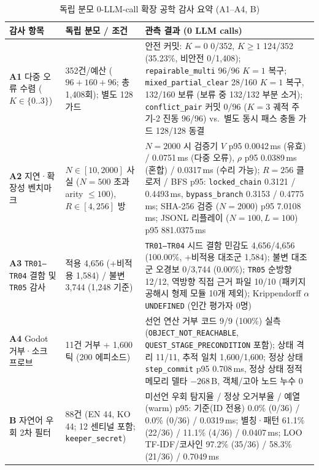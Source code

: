 \documentclass[journal]{IEEEtran}
\renewcommand{\arraystretch}{1.20}
\begin{document}
\begin{table}[!tbp]
\caption{독립 분모 0-LLM-call 확장 공학 감사 요약 (A1--A4, B)}
\label{tab:extended-audits}
\centering
\small
\renewcommand{\arraystretch}{1.20}
\begin{tabularx}{\textwidth}{@{}>{\raggedright\arraybackslash}p{} >{\raggedright\arraybackslash}p{} >{\raggedright\arraybackslash}X@{}}
\toprule
\textbf{감사 항목} & \textbf{독립 분모 / 조건} & \textbf{관측 결과 (0 LLM calls)} \\
\midrule
\textbf{A1} 다중 오류 수렴 ($K{\in}\{0..3\}$) & 352건/예산 ($96{+}160{+}96$; 총 1,408회); 별도 128 가드 & 안전 커밋: $K{=}0$ 0/352, $K{\ge}1$ 124/352 (35.23\%, 비안전 0/1,408); \texttt{repairable\_}\allowbreak\texttt{multi} 96/96 $K{=}1$ 복구; \texttt{mixed\_}\allowbreak\texttt{partial\_}\allowbreak\texttt{clear} 28/160 $K{=}1$ 복구, 132/160 보류 (보류 중 132/132 부분 소거); \texttt{conflict\_}\allowbreak\texttt{pair} 커밋 0/96 ($K{=}3$ 궤적 주기-2 진동 96/96) vs.\ 별도 동시 패스 충돌 가드 128/128 동결 \\
\textbf{A2} 지연·확장성 벤치마크 & $N{\in}[10,2000]$ 사실 ($N{=}500$ 초과 arity ${\le}100$), $R{\in}[4,256]$ 방 & $N{=}2000$ 시 검증기 $V$ p95 0.0042\,ms (유효) / 0.0751\,ms (다중 오류), $\rho$ p95 0.0389\,ms (혼합) / 0.0317\,ms (수리 가능); $R{=}256$ 클로저 / BFS p95: \texttt{locked\_}\allowbreak\texttt{chain} 0.3121 / 0.4493\,ms, \texttt{bypass\_}\allowbreak\texttt{branch} 0.3153 / 0.4775\,ms; SHA-256 검증 ($N{=}2000$) p95 7.0108\,ms; JSONL 리플레이 ($N{=}100, L{=}100$) p95 881.0375\,ms \\
\textbf{A3} \texttt{TR01--TR04} 결함 및 \texttt{TR05} 감사 & 적용 4,656 (+비적용 1,584) / 불변 3,744 (1,248 기준) & \texttt{TR01--TR04} 시드 결함 민감도 4,656/4,656 (100.00\%, +비적용 대조군 1,584); 불변 대조군 오경보 0/3,744 (0.00\%); \texttt{TR05} 순방향 12/12, 역방향 직접 근거 파일 10/10 (패키지 공해시 형제 모듈 10개 제외); Krippendorff $\alpha$ \texttt{UNDEFINED} (인간 평가자 0명) \\
\textbf{A4} Godot 거부·소크 프로브 & 11건 거부 + 1,600틱 (200 에피소드) & 선언 연산 거부 코드 9/9 (100\%) 실측(\texttt{OBJECT\_}\allowbreak\texttt{NOT\_}\allowbreak\texttt{REACHABLE}, \texttt{QUEST\_}\allowbreak\texttt{STAGE\_}\allowbreak\texttt{PRECONDITION} 포함); 상태 격리 11/11, 추적 일치 1,600/1,600; 정상 상태 \texttt{step\_}\allowbreak\texttt{commit} p95 0.708\,ms, 정상 상태 정적 메모리 델타 $-268$\,B, 객체/고아 노드 누수 0 \\
\textbf{B} 자연어 우회 2차 필터 & 88건 (EN 44, KO 44; 12 센티널 포함; \texttt{keeper\_}\allowbreak\texttt{secret}) & 미선언 우회 탐지율 / 정상 오거부율 / 예열(warm) p95: 기준(ID 전용) 0.0\% (0/36) / 0.0\% (0/36) / 0.0319\,ms; 별칭·패턴 61.1\% (22/36) / 11.1\% (4/36) / 0.0407\,ms; LOO TF-IDF/코사인 97.2\% (35/36) / 58.3\% (21/36) / 0.7049\,ms \\
\bottomrule
\end{tabularx}
\end{table}
\end{document}
